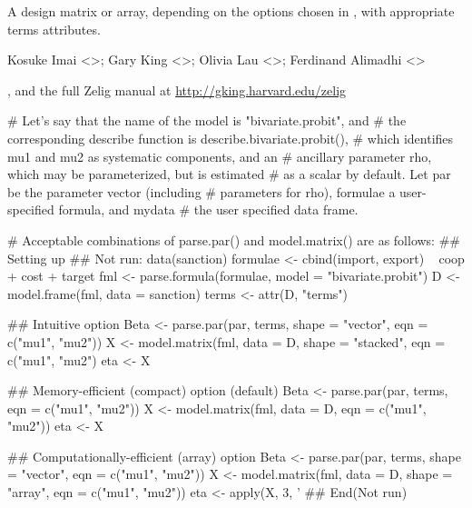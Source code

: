 \begin{Value}
A design matrix or array, depending on the options chosen in , with appropriate terms 
attributes.
\end{Value}
\begin{Author}\relax
Kosuke Imai <>; Gary King
<>; Olivia Lau <>; Ferdinand Alimadhi
<>
\end{Author}
\begin{SeeAlso}\relax
{},  and the full Zelig manual at
\url{http://gking.harvard.edu/zelig}
\end{SeeAlso}
\begin{Examples}
\begin{ExampleCode}

# Let's say that the name of the model is "bivariate.probit", and
# the corresponding describe function is describe.bivariate.probit(),
# which identifies mu1 and mu2 as systematic components, and an
# ancillary parameter rho, which may be parameterized, but is estimated
# as a scalar by default.  Let par be the parameter vector (including
# parameters for rho), formulae a user-specified formula, and mydata
# the user specified data frame.

# Acceptable combinations of parse.par() and model.matrix() are as follows:
## Setting up
## Not run:  
data(sanction)
formulae <- cbind(import, export) ~ coop + cost + target
fml <- parse.formula(formulae, model = "bivariate.probit")
D <- model.frame(fml, data = sanction)
terms <- attr(D, "terms")

## Intuitive option
Beta <- parse.par(par, terms, shape = "vector", eqn = c("mu1", "mu2"))
X <- model.matrix(fml, data = D, shape = "stacked", eqn = c("mu1", "mu2")  
eta <- X 

## Memory-efficient (compact) option (default)
Beta <- parse.par(par, terms, eqn = c("mu1", "mu2"))
X <- model.matrix(fml, data = D, eqn = c("mu1", "mu2"))   
eta <- X 

## Computationally-efficient (array) option
Beta <- parse.par(par, terms, shape = "vector", eqn = c("mu1", "mu2"))
X <- model.matrix(fml, data = D, shape = "array", eqn = c("mu1", "mu2"))
eta <- apply(X, 3, '
## End(Not run)\end{ExampleCode}
\end{Examples}


